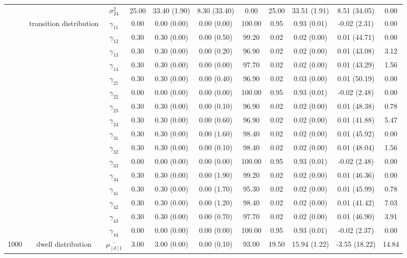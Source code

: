 \begin{table}[h]
{\begin{tabular}{ccccccccccc}
 &  & $\sigma^2_{24}$ & 25.00 & 33.40 (1.90) & 8.30 (33.40) & 0.00 & 25.00 & 33.51 (1.91) & 8.51 (34.05) & 0.00 \\
 & transition distribution & $\gamma_{11}$ & 0.00 & 0.00 (0.00) & 0.00 (0.00) & 100.00 & 0.95 & 0.93 (0.01) & -0.02 (2.31) & 0.00 \\
 & \multirow{15}{*}{} & $\gamma_{12}$ & 0.30 & 0.30 (0.00) & 0.00 (0.50) & 99.20 & 0.02 & 0.02 (0.00) & 0.01 (44.71) & 0.00 \\
 &  & $\gamma_{13}$ & 0.30 & 0.30 (0.00) & 0.00 (0.20) & 96.90 & 0.02 & 0.02 (0.00) & 0.01 (43.08) & 3.12 \\
 &  & $\gamma_{14}$ & 0.30 & 0.30 (0.00) & 0.00 (0.00) & 97.70 & 0.02 & 0.02 (0.00) & 0.01 (43.29) & 1.56 \\
 &  & $\gamma_{21}$ & 0.30 & 0.30 (0.00) & 0.00 (0.40) & 96.90 & 0.02 & 0.03 (0.00) & 0.01 (50.19) & 0.00 \\
 &  & $\gamma_{22}$ & 0.00 & 0.00 (0.00) & 0.00 (0.00) & 100.00 & 0.95 & 0.93 (0.01) & -0.02 (2.48) & 0.00 \\
 &  & $\gamma_{23}$ & 0.30 & 0.30 (0.00) & 0.00 (0.10) & 96.90 & 0.02 & 0.02 (0.00) & 0.01 (48.38) & 0.78 \\
 &  & $\gamma_{24}$ & 0.30 & 0.30 (0.00) & 0.00 (0.60) & 96.90 & 0.02 & 0.02 (0.00) & 0.01 (41.88) & 5.47 \\
 &  & $\gamma_{31}$ & 0.30 & 0.30 (0.00) & 0.00 (1.60) & 98.40 & 0.02 & 0.02 (0.00) & 0.01 (45.92) & 0.00 \\
 &  & $\gamma_{32}$ & 0.30 & 0.30 (0.00) & 0.00 (0.10) & 98.40 & 0.02 & 0.02 (0.00) & 0.01 (48.04) & 1.56 \\
 &  & $\gamma_{33}$ & 0.00 & 0.00 (0.00) & 0.00 (0.00) & 100.00 & 0.95 & 0.93 (0.01) & -0.02 (2.48) & 0.00 \\
 &  & $\gamma_{34}$ & 0.30 & 0.30 (0.00) & 0.00 (1.90) & 99.20 & 0.02 & 0.02 (0.00) & 0.01 (46.36) & 0.00 \\
 &  & $\gamma_{41}$ & 0.30 & 0.30 (0.00) & 0.00 (1.70) & 95.30 & 0.02 & 0.02 (0.00) & 0.01 (45.99) & 0.78 \\
 &  & $\gamma_{42}$ & 0.30 & 0.30 (0.00) & 0.00 (1.20) & 98.40 & 0.02 & 0.02 (0.00) & 0.01 (41.42) & 7.03 \\
 &  & $\gamma_{43}$ & 0.30 & 0.30 (0.00) & 0.00 (0.70) & 97.70 & 0.02 & 0.02 (0.00) & 0.01 (46.90) & 3.91 \\
 &  & $\gamma_{44}$ & 0.00 & 0.00 (0.00) & 0.00 (0.00) & 100.00 & 0.95 & 0.93 (0.01) & -0.02 (2.37) & 0.00 \\ \midrule
1000 & dwell distribution & $\bar{\mu_{[d]1}}$ & 3.00 & 3.00 (0.00) & 0.00 (0.10) & 93.00 & 19.50 & 15.94 (1.22) & -3.55 (18.22) & 14.84 \\

\end{tabular}}
\end{table}
